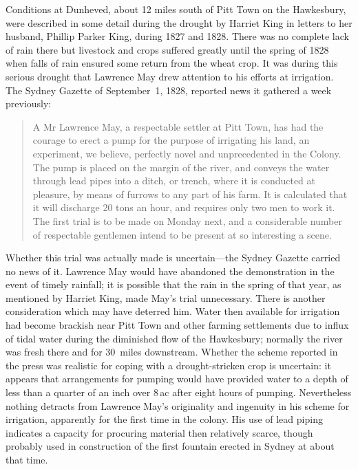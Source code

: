 Conditions at Dunheved, about 12 miles south of Pitt Town on the
Hawkesbury, were described in some detail during the drought by
Harriet King in letters to her husband, Phillip Parker King, during
1827 and 1828. There was
no complete lack of rain there but livestock and crops suffered
greatly until the spring of 1828 when falls of rain ensured some
return from the wheat crop.  It was during this serious drought that
Lawrence May drew attention to his efforts at irrigation.  The Sydney
Gazette of September~1, 1828, reported news it gathered a week
previously:
\begin{quote}
	A Mr Lawrence May, a respectable settler at Pitt Town, has had
	the courage to erect a pump for the purpose of irrigating his
	land, an experiment, we believe, perfectly novel and
	unprecedented in the Colony. The pump is placed on the margin
	of the river, and conveys the water through lead pipes into a
	ditch, or trench, where it is conducted at pleasure, by means
	of furrows to any part of his farm. It is calculated that it
	will discharge 20 tons an hour, and requires only two men to
	work it. The first trial is to be made on Monday next, and a
	considerable number of respectable gentlemen intend to be
	present at so interesting a scene.
\end{quote}

Whether this trial was actually made is uncertain---the Sydney Gazette
carried no news of it.  Lawrence May would have abandoned the
demonstration in the event of timely rainfall; it is possible that the
rain in the spring of that year, as mentioned by Harriet King, made
May's trial unnecessary.  There is another consideration which may
have deterred him.  Water then available for irrigation had become
brackish near Pitt Town and other farming settlements due to influx of
tidal water during the diminished flow of the Hawkesbury; normally the
river was fresh there and for 30~miles downstream.  Whether the scheme reported in the press was
realistic for coping with a drought-stricken crop is uncertain: it
appears that arrangements for pumping would have provided water to a
depth of less than a quarter of an inch over 8\,ac after eight hours
of pumping.  Nevertheless nothing detracts from Lawrence May's
originality and ingenuity in his scheme for irrigation, apparently for
the first time in the colony.  His use of lead piping indicates a
capacity for procuring material then relatively scarce, though
probably used in construction of the first fountain erected in Sydney
at about that time.

